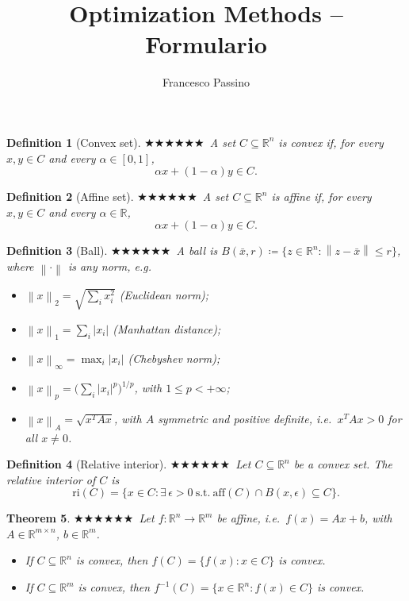 \documentclass[11pt,a4paper]{article}
\title{Optimization Methods -- Formulario}
\author{Francesco Passino}
\date{}
\newcommand{\R}{\mathbb{R}}
\newcommand{\norm}[1]{\left\lVert #1 \right\rVert}
\theoremstyle{breakdef}
\newtheorem{definition}{Definition}[section]
\theoremstyle{breakplain}
\newtheorem{theorem}[definition]{Theorem}
\theoremstyle{remark}
\newcommand{\imp}[1]{\textcolor{impcolor}{%
  \ifcase#1\or$\bigstar$\or$\bigstar\bigstar$\or$\bigstar\bigstar\bigstar$\fi}\ }
\begin{document}
\maketitle


\begin{definition}[Convex set]
\imp{3}A set $C \subseteq \R^n$ is \emph{convex} if, for every $x, y \in C$ and every $\alpha \in [0,1]$,
\[
  \alpha x + (1-\alpha) y \in C.
\]
\end{definition}

\begin{definition}[Affine set]
\imp{2}A set $C \subseteq \R^n$ is \emph{affine} if, for every $x, y \in C$ and every $\alpha \in \R$,
\[
  \alpha x + (1-\alpha) y \in C.
\]
\end{definition}

\begin{definition}[Ball]
\imp{1}A \emph{ball} is $B(\bar{x}, r) \coloneqq \{z \in \R^n : \norm{z - \bar{x}} \le r\}$, where $\norm{\cdot}$ is any norm, e.g.
\begin{itemize}
    \item $\norm{x}_2 = \sqrt{\sum_i x_i^2}$ (Euclidean norm);
    \item $\norm{x}_1 = \sum_i |x_i|$ (Manhattan distance);
    \item $\norm{x}_\infty = \max_i |x_i|$ (Chebyshev norm);
    \item $\norm{x}_p = \big(\sum_i |x_i|^p\big)^{1/p}$, with $1 \le p < +\infty$;
    \item $\norm{x}_A = \sqrt{x^TAx}$, with $A$ symmetric and positive definite, i.e.\ $x^TAx > 0$ for all $x \neq 0$.
\end{itemize}
\end{definition}

\begin{definition}[Relative interior]
\imp{1}Let $C \subseteq \R^n$ be a convex set. The \emph{relative interior} of $C$ is
\[
    \mathrm{ri}(C)=\{x \in C : \exists\,\epsilon > 0\ \text{s.t.}\ \mathrm{aff}(C) \cap B(x,\epsilon)\subseteq C\}.
\]
\end{definition}

\begin{theorem}
\imp{2}Let $f: \R^n \to \R^m$ be affine, i.e.\ $f(x) = Ax + b$, with $A \in \R^{m \times n}$, $b \in \R^m$.
\begin{itemize}
    \item If $C \subseteq \R^n$ is convex, then $f(C) = \{f(x) : x \in C\}$ is convex.
    \item If $C \subseteq \R^m$ is convex, then $f^{-1}(C) = \{x \in \R^n : f(x) \in C\}$ is convex.
\end{itemize}
\end{theorem}
\end{document}
